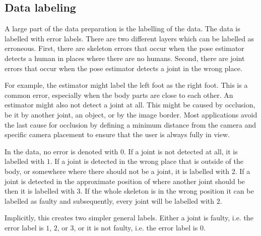 \subsection{Data labeling}
\label{sec:data_labeling}

A large part of the data preparation is the labelling of the data. The data is labelled with error labels. There are two different layers which can be labelled as erroneous. First, there are skeleton errors that occur when the pose estimator detects a human in places where there are no humans. Second, there are joint errors that occur when the pose estimator detects a joint in the wrong place. 

For example, the estimator might label the left foot as the right foot. This is a common error, especially when the body parts are close to each other. An estimator might also not detect a joint at all. This might be caused by occlusion, be it by another joint, an object, or by the image border. Most applications avoid the last cause for occlusion by defining a minimum distance from the camera and specific camera placement to ensure that the user is always fully in view.

In the data, no error is denoted with $0$. If a joint is not detected at all, it is labelled with $1$. If a joint is detected in the wrong place that is outside of the body, or somewhere where there should not be a joint, it is labelled with $2$. If a joint is detected in the approximate position of where another joint should be then it is labelled with $3$. If the whole skeleton is in the wrong position it can be labelled as faulty and subsequently, every joint will be labelled with $2$.

Implicitly, this creates two simpler general labels. Either a joint is faulty, i.e. the error label is $1$, $2$, or $3$, or it is not faulty, i.e. the error label is $0$.